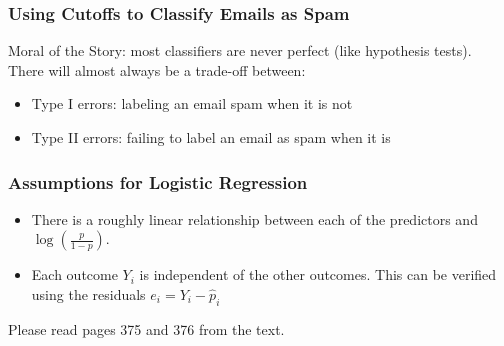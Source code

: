\documentclass[handout]{beamer}
\newcommand{\blue}[1]{\textcolor{blue2}{#1}}
\begin{document}
\begin{frame}[fragile]
\frametitle{Using Cutoffs to Classify Emails as Spam}

\blue{Moral of the Story}:  most classifiers are never perfect (like hypothesis tests).  There will almost always be a trade-off between:  
\begin{itemize}
\item Type I errors:  labeling an email spam when it is not
\item Type II errors:  failing to label an email as spam when it is 
\end{itemize}

\end{frame}


\begin{frame}[fragile]
\frametitle{Assumptions for Logistic Regression}
\begin{itemize}
\item There is a roughly linear relationship between each of the predictors and $\log\left(\frac{p}{1-p}\right)$.
\pause\item Each outcome $Y_i$ is independent of the other outcomes.  This can be verified using the residuals $e_i = Y_i - \widehat{p}_i$
\end{itemize}

\pause Please read pages 375 and 376 from the text.  

\end{frame}
\end{document}
